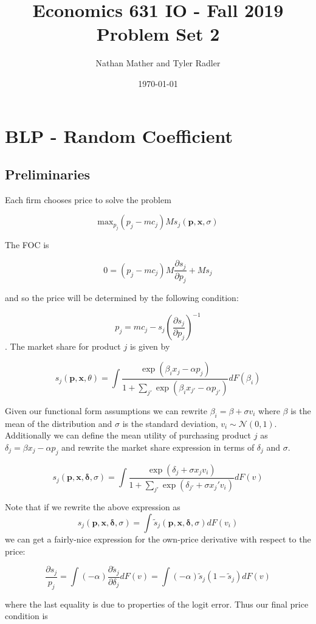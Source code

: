 \documentclass{article}
\title{Economics 631 IO - Fall 2019\\Problem Set 2}
\author{Nathan Mather and Tyler Radler}
\date{\today}
\newcommand{\1}{\mathbbm{1}}
\begin{document}
\maketitle

\section{BLP - Random Coefficient}

\subsection*{Preliminaries}
Each firm chooses price to solve the problem

$$\text{max}_{p_j} (p_j - mc_j)Ms_j(\bm p, \bm x, \sigma)$$

The FOC is

$$0 = (p_j - mc_j)M\frac{\partial s_j}{\partial p_j} + M s_j$$

and so the price will be determined by the following condition:

$$p_j = mc_j-s_j(\frac{\partial s_j}{\partial p_j})^{-1}$$.
 The market share for product $j$ is given by 

$$ s_{j}(\bm p, \bm x, \theta) = \int \frac{\exp (\beta_i x_{j} - \alpha p_{j})} {1 + \sum_{j'} \exp(\beta_i x_{j'} - \alpha p_{j'})} dF(\beta_{i})$$

Given our functional form assumptions we can rewrite $\beta_{i} = \beta + \sigma v_{i}$ where $\beta$ is the mean of the distribution and $\sigma$ is the standard deviation, $v_i \sim \mathcal{N}(0,1)$. Additionally we can define the mean utility of purchasing product $j$ as $\delta_j = \beta x_{j} - \alpha p_j$ and rewrite the market share expression in terms of $\delta_j$ and $\sigma$.

$$ s_{j}(\bm p, \bm x, \bm \delta, \sigma) = 
\int \frac{\exp (\delta_j  + \sigma x_j v_{i})}
{1 + \sum_{j'} \exp(\delta_{j'} + \sigma x_j' v_{i})}
dF(v)
$$
	
Note that if we rewrite the above expression as $$s_{j}(\bm p, \bm x, \bm \delta, \sigma) = 
\int \tilde{s}_j (\bm p, \bm x, \bm \delta, \sigma)  dF(v_{i}) $$ we can get a fairly-nice expression for the own-price derivative with respect to the price:

$$\frac{\partial s_j}{p_j} = \int (-\alpha)\frac{\partial \tilde{s}_j}{\partial \delta_j}dF(v) = \int (-\alpha)\tilde{s}_j(1-\tilde{s}_j)dF(v)$$

where the last equality is due to properties of the logit error. Thus our final price condition is 
\end{document}
